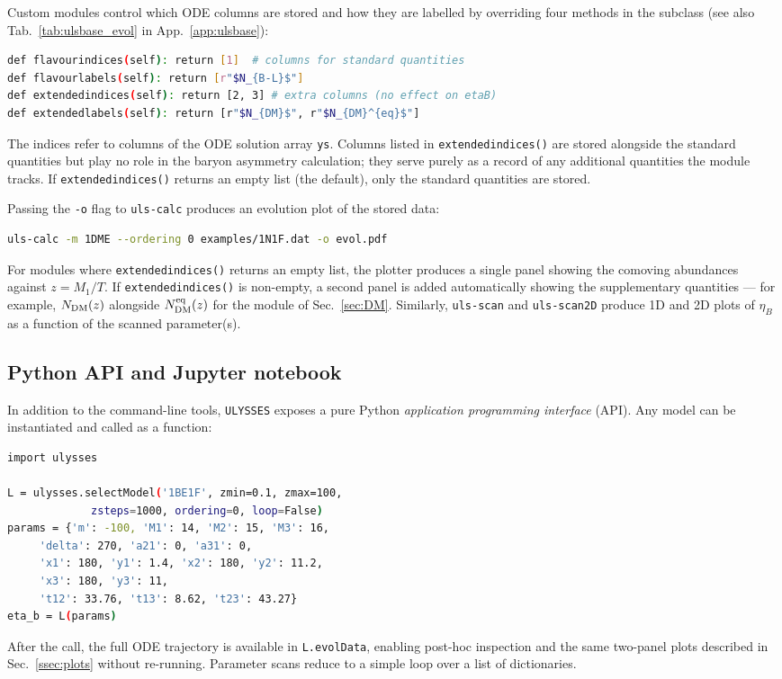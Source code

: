 \documentclass[12pt, a4paper]{article}
\begin{document}
Custom modules control which ODE columns are stored and how they are labelled by overriding four methods in the subclass (see also Tab.~\ref{tab:ulsbase_evol} in App.~\ref{app:ulsbase}):
\begin{lstlisting}[language = bash]
def flavourindices(self): return [1]  # columns for standard quantities
def flavourlabels(self): return [r"$N_{B-L}$"]
def extendedindices(self): return [2, 3] # extra columns (no effect on etaB)
def extendedlabels(self): return [r"$N_{DM}$", r"$N_{DM}^{eq}$"]
\end{lstlisting}
The indices refer to columns of the ODE solution array \texttt{ys}. Columns listed in \texttt{extendedindices()} are stored alongside the standard quantities but play no role in the baryon asymmetry calculation; they serve purely as a record of any additional quantities the module tracks. If \texttt{extendedindices()} returns an empty list (the default), only the standard quantities are stored.

Passing the \texttt{-o} flag to \texttt{uls-calc} produces an evolution plot of the stored data:
\begin{lstlisting}[language = bash]
uls-calc -m 1DME --ordering 0 examples/1N1F.dat -o evol.pdf
\end{lstlisting}
For modules where \texttt{extendedindices()} returns an empty list, the plotter produces a single panel showing the comoving abundances against $z = M_1/T$. If \texttt{extendedindices()} is non-empty, a second panel is added automatically showing the supplementary quantities --- for example, $N_{\rm DM}(z)$ alongside $N_{\rm DM}^{\rm eq}(z)$ for the module of Sec.~\ref{sec:DM}. Similarly, \texttt{uls-scan} and \texttt{uls-scan2D} produce 1D and 2D plots of $\eta_B$ as a function of the scanned parameter(s).


\subsection{Python API and Jupyter notebook}
\label{ssec:notebook}

In addition to the command-line tools, \texttt{ULYSSES} exposes a pure Python \textit{application programming interface} (API). Any model can be instantiated and called as a function:
\begin{lstlisting}[language = bash]
import ulysses

L = ulysses.selectModel('1BE1F', zmin=0.1, zmax=100,
             zsteps=1000, ordering=0, loop=False)
params = {'m': -100, 'M1': 14, 'M2': 15, 'M3': 16,
     'delta': 270, 'a21': 0, 'a31': 0,
     'x1': 180, 'y1': 1.4, 'x2': 180, 'y2': 11.2,
     'x3': 180, 'y3': 11,
     't12': 33.76, 't13': 8.62, 't23': 43.27}
eta_b = L(params)
\end{lstlisting}
After the call, the full ODE trajectory is available in \texttt{L.evolData}, enabling post-hoc inspection and the same two-panel plots described in Sec.~\ref{ssec:plots} without re-running. Parameter scans reduce to a simple loop over a list of dictionaries.
\end{document}
